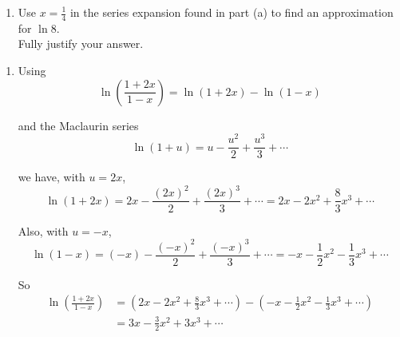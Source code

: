 \documentclass[leqno]{article}
\begin{document}
\begin{enumerate}[
  label=\textbf{\arabic*.},
  leftmargin=*,
  topsep=0pt,
  partopsep=0pt,
  parsep=0pt
]
\begin{enumerate}[label=\textbf{(\alph*)}]
  Sam's incorrect working is shown below.
\begin{tcolorbox}[enhanced,boxrule=0.4pt,colback=white,arc=0mm,outer arc=0mm]
  \[
  \begin{aligned}
  \text{Let } \frac{1+2x}{1-x} &= 6\\
  1+2x &= 6-6x\\
  8x &= 5\\
  x &= \frac{5}{8}
  \end{aligned}
  \] \\
  \[
  \begin{aligned}
  \text{So } \ln 6 &\approx 3\left(\frac{5}{8}\right)-\frac{3}{2}\left(\frac{5}{8}\right)^2+3\left(\frac{5}{8}\right)^3\\
  &\approx 2.02
  \end{aligned}
  \]
\end{tcolorbox}
  Explain the error in Sam's working.  \\
  \item Use $x=\frac{1}{4}$ in the series expansion found in part (a) to find an approximation for $\ln 8$. \\

  Fully justify your answer.  \\
\end{enumerate}

\vspace*{30pt}

\begin{tcolorbox}[colback=white, colframe=scarlet, title={\textbf{Solution}}, breakable, grow to left by=6mm, grow to right by=10mm]
\begin{enumerate}[label=\textbf{(\alph*)}]
  \item Using
\[
\ln\left(\frac{1+2x}{1-x}\right)=\ln(1+2x)-\ln(1-x)
\]

and the Maclaurin series
\[
\ln(1+u)=u-\frac{u^2}{2}+\frac{u^3}{3}+\cdots
\]

we have, with $u=2x$,
\[
\ln(1+2x)=2x-\frac{(2x)^2}{2}+\frac{(2x)^3}{3}+\cdots
=2x-2x^2+\frac{8}{3}x^3+\cdots
\]

Also, with $u=-x$,
\[
\ln(1-x)=(-x)-\frac{(-x)^2}{2}+\frac{(-x)^3}{3}+\cdots
=-x-\frac12x^2-\frac13x^3+\cdots
\]

So
\begin{align*}
\ln\left(\frac{1+2x}{1-x}\right)
&=\left(2x-2x^2+\frac{8}{3}x^3+\cdots\right)-\left(-x-\frac12x^2-\frac13x^3+\cdots\right) \\
&=3x-\frac32x^2+3x^3+\cdots
\end{align*}


\end{enumerate}
\end{tcolorbox}
\end{enumerate}
\end{document}
